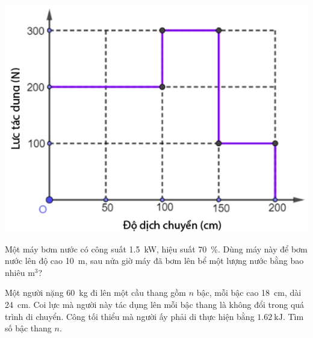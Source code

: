 \begin{ex}
	{\includegraphics[scale=0.5]{../figs/D10-KTTX2-HK2-5}}
	\loigiai{
		
	}
\end{ex}
\begin{ex}
Một máy bơm nước có công suất \SI{1.5}{\kilo\watt}, hiệu suất \SI{70}{\percent}. Dùng máy này để bơm nước lên độ cao \SI{10}{\meter}, sau nửa giờ máy đã bơm lên bể một lượng nước bằng bao nhiêu $\si{\meter^3}$?
	\loigiai{
		
	}
\end{ex}
\begin{ex}
	Một người nặng \SI{60}{\kilogram} đi lên một cầu thang gồm $n$ bậc, mỗi bậc cao \SI{18}{\centi\meter}, dài \SI{24}{\centi\meter}. Coi lực mà người này tác dụng lên mỗi bậc thang là không đổi trong quá trình di chuyển. Công tối thiểu mà người ấy phải di thực hiện bằng $\SI{1.62}{\kilo\joule}$. Tìm số bậc thang $n$.
	\loigiai{
		
	}
\end{ex}

